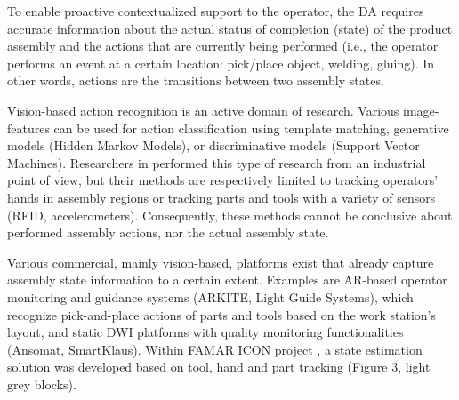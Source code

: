 To enable proactive contextualized support to the operator, the DA requires accurate information about the actual status of completion (state) of the product assembly and the actions that are currently being performed (i.e., the operator performs an event at a certain location: pick/place object, welding, gluing). In other words, actions are the transitions between two assembly states.
 
Vision-based action recognition \cite{beddiar2020VisionbasedHumanActivity, zhang2017ReviewHumanActivity} is an active domain of research. Various image-features can be used for action classification using template matching, generative models (Hidden Markov Models), or discriminative models (Support Vector Machines). Researchers in \cite{kaczmarek2015ProgressMonitoringGesture,karcher2018SensordrivenAnalysisManual} performed this type of research from an industrial point of view, but their methods are respectively limited to tracking operators' hands in assembly regions or tracking parts and tools with a variety of sensors (RFID, accelerometers). Consequently, these methods cannot be conclusive about performed assembly actions, nor the actual assembly state.

Various commercial, mainly vision-based, platforms exist that already capture assembly state information to a certain extent. Examples are AR-based operator monitoring and guidance systems (ARKITE, Light Guide Systems), which recognize pick-and-place actions of parts and tools based on the work station's layout, and static DWI platforms with quality monitoring functionalities (Ansomat, SmartKlaus). Within FAMAR ICON project \cite{zogopoulos2021ImagebasedStateTracking}, a state estimation solution was developed based on tool, hand and part tracking (Figure 3, light grey blocks).
